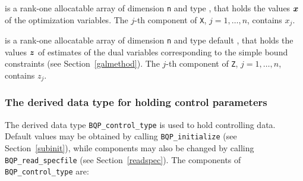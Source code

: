 \documentclass{galahad}
\newcommand{\packagename}{BQP}
\begin{document}
\begin{description}
 is a rank-one allocatable array of dimension {\tt n} and type 
\realdp, 
that holds the values ${\bm{x}}$ of the optimization variables.
The $j$-th component of {\tt X}, $j = 1,  \ldots , n$, contains $x_{j}$.  

 is a rank-one allocatable array of dimension {\tt n} and type default 
\realdp, that holds
the values ${\bm{z}}$ of estimates  of the dual variables 
corresponding to the simple bound constraints (see Section~\ref{galmethod}).
The $j$-th component of {\tt Z}, $j = 1,  \ldots ,  n$, contains $z_{j}$.  

\end{description}


\subsubsection{The derived data type for holding control 
 parameters}\label{typecontrol}
The derived data type 
{\tt \packagename\_control\_type} 
is used to hold controlling data. Default values may be obtained by calling 
{\tt \packagename\_initialize}
(see Section~\ref{subinit}),
while components may also be changed by calling 
{\tt \packagename\_read\-\_specfile}
(see Section~\ref{readspec}). 
The components of 
{\tt \packagename\_control\_type} 
are:
\end{document}
